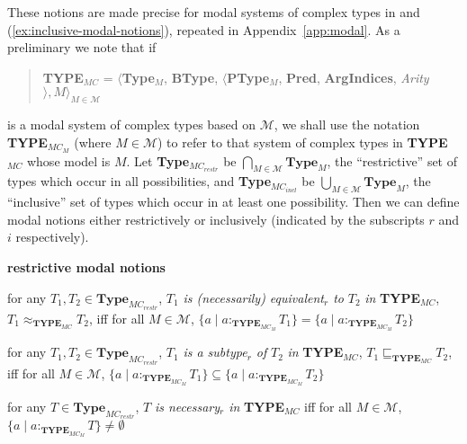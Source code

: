 \begin{shaded}

These notions are made precise for modal systems of complex types in
\nexteg{} and (\ref{ex:inclusive-modal-notions}), repeated in Appendix~\ref{app:modal}.  As a preliminary we
note that if
\begin{quote}
{\bf TYPE$_{\mathit{MC}}$} = $\langle${\bf Type}$_M$, {\bf BType},
$\langle$\textbf{PType}$_M$, {\bf Pred}, \textbf{ArgIndices}, {\it
  Arity\/}$\rangle, M\rangle_{M\in\mathcal{M}}$
\end{quote}
is a modal system of complex types based
on $\mathcal{M}$, we shall use the notation {\bf
  TYPE$_{\mathit{MC}_M}$} (where $M\in\mathcal{M}$) to refer to that
system of complex types in {\bf TYPE$_{\mathit{MC}}$} whose model is
$M$.  Let \textbf{Type}$_{\mathit{MC}_{\mathit{restr}}}$ be
  $\bigcap\limits_{M\in\mathcal{M}}\!\textbf{Type}_M$, the
  ``restrictive'' set of
  types which occur in all possibilities,  and \textbf{Type}$_{\mathit{MC}_{\mathit{incl}}}$ be
  $\bigcup\limits_{M\in\mathcal{M}}\!\textbf{Type}_M$, the
  ``inclusive'' set of
  types which occur in at least one possibility. Then we can define
  modal notions either restrictively or inclusively (indicated by the
  subscripts $r$ and $i$ respectively).

 \begin{ex} 
\textbf{restrictive modal notions}  
\begin{subex} 
 
\item for any $T_1,T_2\in\textbf{Type}_{\mathit{MC}_{\mathit{restr}}}$, $T_1$ \textit{is
    (necessarily) equivalent$_r$
    to} $T_2$ \textit{in} {\bf TYPE$_{\mathit{MC}}$},
  $T_1\approx_{\mathbf{TYPE_{\mathit{MC}}}}T_2$,  iff for all
  $M\in\mathcal{M}$, $\{a\mid a:_{\mathbf{TYPE}_{\mathit{MC}_M}}T_1\}=\{a\mid a:_{\mathbf{TYPE}_{\mathit{MC}_M}}T_2\}$
  
 
\item for any $T_1,T_2\in\textbf{Type}_{\mathit{MC}_{\mathit{restr}}}$, $T_1$ \textit{is a subtype$_r$ of} $T_2$ \textit{in} {\bf TYPE$_{\mathit{MC}}$},
  $T_1\sqsubseteq_{\mathbf{TYPE_{\mathit{MC}}}}T_2$,  iff for all
  $M\in\mathcal{M}$, $\{a\mid a:_{\mathbf{TYPE}_{\mathit{MC}_M}}T_1\}\subseteq\{a\mid a:_{\mathbf{TYPE}_{\mathit{MC}_M}}T_2\}$

\item for any $T\in\textbf{Type}_{\mathit{MC}_{\mathit{restr}}}$, $T$ \textit{is necessary$_r$ in} {\bf TYPE$_{\mathit{MC}}$}  iff for all
  $M\in\mathcal{M}$, \\ $\{a\mid a:_{\mathbf{TYPE}_{\mathit{MC}_M}}T\}\not=\emptyset$


\end{subex}
\end{ex}
\end{shaded}
